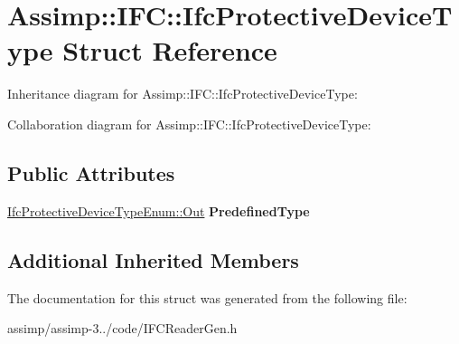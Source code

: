 \hypertarget{struct_assimp_1_1_i_f_c_1_1_ifc_protective_device_type}{\section{Assimp\+:\+:I\+F\+C\+:\+:Ifc\+Protective\+Device\+Type Struct Reference}
\label{struct_assimp_1_1_i_f_c_1_1_ifc_protective_device_type}
}


Inheritance diagram for Assimp\+:\+:I\+F\+C\+:\+:Ifc\+Protective\+Device\+Type\+:


Collaboration diagram for Assimp\+:\+:I\+F\+C\+:\+:Ifc\+Protective\+Device\+Type\+:
\subsection*{Public Attributes}
\begin{DoxyCompactItemize}
\item 
\hypertarget{struct_assimp_1_1_i_f_c_1_1_ifc_protective_device_type_a2b45a5c0982822f4aaccf4d4095fb18c}{\hyperlink{classboost_1_1shared__ptr}{Ifc\+Protective\+Device\+Type\+Enum\+::\+Out} {\bfseries Predefined\+Type}}\label{struct_assimp_1_1_i_f_c_1_1_ifc_protective_device_type_a2b45a5c0982822f4aaccf4d4095fb18c}

\end{DoxyCompactItemize}
\subsection*{Additional Inherited Members}


The documentation for this struct was generated from the following file\+:\begin{DoxyCompactItemize}
\item 
assimp/assimp-\/3../code/I\+F\+C\+Reader\+Gen.\+h\end{DoxyCompactItemize}
